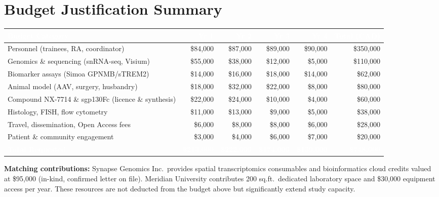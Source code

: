 \section{Budget Justification Summary}

\renewcommand{\arraystretch}{1.25}
\begin{tabularx}{\linewidth}{@{} X r r r r r @{}}
  \toprule
  \rowcolor{cihrNavy}
  \textcolor{white}{\textbf{Budget Category}} &
  \textcolor{white}{\textbf{Yr 1}} &
  \textcolor{white}{\textbf{Yr 2}} &
  \textcolor{white}{\textbf{Yr 3}} &
  \textcolor{white}{\textbf{Yr 4}} &
  \textcolor{white}{\textbf{Total (CAD)}} \\
  \midrule
  Personnel (trainees, RA, coordinator)
    & \$84,000 & \$87,000 & \$89,000 & \$90,000 & \$350,000 \\
  \rowcolor{cihrLightGray}
  Genomics \& sequencing (snRNA-seq, Visium)
    & \$55,000 & \$38,000 & \$12,000 & \$5,000 & \$110,000 \\
  Biomarker assays (Simoa GPNMB/sTREM2)
    & \$14,000 & \$16,000 & \$18,000 & \$14,000 & \$62,000 \\
  \rowcolor{cihrLightGray}
  Animal model (AAV, surgery, husbandry)
    & \$18,000 & \$32,000 & \$22,000 & \$8,000 & \$80,000 \\
  Compound NX-7714 \& sgp130Fc (licence \& synthesis)
    & \$22,000 & \$24,000 & \$10,000 & \$4,000 & \$60,000 \\
  \rowcolor{cihrLightGray}
  Histology, FISH, flow cytometry
    & \$11,000 & \$13,000 & \$9,000 & \$5,000 & \$38,000 \\
  Travel, dissemination, Open Access fees
    & \$6,000 & \$8,000 & \$8,000 & \$6,000 & \$28,000 \\
  \rowcolor{cihrLightGray}
  Patient \& community engagement
    & \$3,000 & \$4,000 & \$6,000 & \$7,000 & \$20,000 \\
  \midrule
  \rowcolor{cihrNavy}
  \textbf{\textcolor{white}{Total Requested}}
    & \textcolor{white}{\textbf{\$213,000}}
    & \textcolor{white}{\textbf{\$222,000}}
    & \textcolor{white}{\textbf{\$174,000}}
    & \textcolor{white}{\textbf{\$139,000}}
    & \textcolor{white}{\textbf{\$748,000}} \\
  \bottomrule
\end{tabularx}

\vspace{4pt}
\begin{tcolorbox}[goldbox]
  \fontsize{8.5}{10.5}\selectfont
  \textbf{Matching contributions:} Synapse Genomics Inc.\ provides spatial transcriptomics consumables and bioinformatics cloud credits valued at \$95,000 (in-kind, confirmed letter on file). Meridian University contributes 200 sq.ft.\ dedicated laboratory space and \$30,000 equipment access per year. These resources are not deducted from the budget above but significantly extend study capacity.
\end{tcolorbox}

